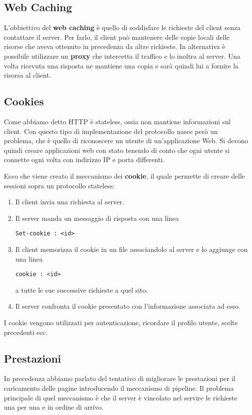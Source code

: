 \subsection{Web Caching}
L'obbiettivo del \textbf{web caching} è quello di soddisfare le richieste del client senza
contattare il server. Per farlo, il client può mantenere delle copie locali delle risorse che aveva
ottenuto in precedenza da altre richieste.
In alternativa è possibile utilizzare un \textbf{proxy} che intercetta il traffico e lo inoltra al 
server. Una volta ricevuta una risposta ne mantiene una copia e sarà quindi lui a fornire la
risorsa al client.

\subsection{Cookies}
Come abbiamo detto HTTP è stateless, ossia non mantiene informazioni sul client. Con questo tipo
di implementazione del protocollo nasce però un problema, che è quello di riconoscere un utente
di un'applicazione Web. Si devono quindi creare applicazioni web con stato tenendo di conto che 
ogni utente si connette ogni volta con indirizzo IP e porta differenti.

Ecco che viene creato il meccanismo dei \textbf{cookie}, il quale permette di creare delle sessioni
sopra un protocollo stateless:
\begin{enumerate}
	\item Il client invia una richiesta al server.
	\item Il server manda un messaggio di risposta con una linea
		\begin{center} \verb|Set-cookie : <id>| \end{center}
	\item Il client memorizza il cookie in un file associandolo al server e lo aggiunge con una 
		linea
		\begin{center} \verb|cookie : <id>| \end{center}
		a tutte le sue successive richieste a quel sito.
	\item Il server confronta il cookie presentato con l'informazione associata ad esso.
\end{enumerate}
I cookie vengono utilizzati per autenticazione, ricordare il profilo utente, scelte precedenti ecc.

\subsection{Prestazioni}
In precedenza abbiamo parlato del tentativo di migliorare le prestazioni per il caricamento delle
pagine introducendo il meccanismo di pipeline. Il problema principale di quel meccanismo è che il
server è vincolato nel servire le richieste una per una e in ordine di arrivo.

